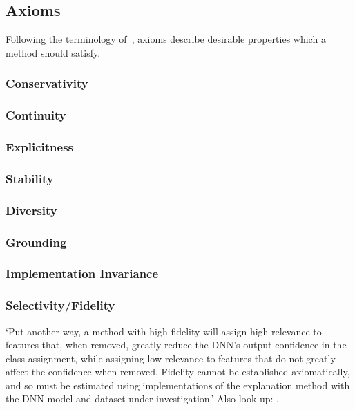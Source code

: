 \subsection{Axioms}
Following the terminology of~\cite{Sundararajan.2017}, axioms describe desirable properties which a method should satisfy.
\subsubsection{Conservativity}
\subsubsection{Continuity}
\subsubsection{Explicitness}
\citeauthor{AlvarezMelis.2018}
\subsubsection{Stability}
\citeauthor{AlvarezMelis.2018}
\subsubsection{Diversity}
\citeauthor{AlvarezMelis.2018}
\subsubsection{Grounding}
\citeauthor{AlvarezMelis.2018}
\subsubsection{Implementation Invariance}
\subsubsection{Selectivity/Fidelity}
`Put another way, a method with high fidelity will assign high relevance to features that, when removed, greatly reduce the DNN’s output confidence in the class assignment, while assigning low relevance to features that do not greatly affect the confidence when removed. Fidelity cannot be established axiomatically, and so must be estimated using implementations of the explanation method with the DNN model and dataset under investigation.'\cite{Tomsett.2019} Also look up: \citeauthor{Bach.2015, AlvarezMelis.2018}.